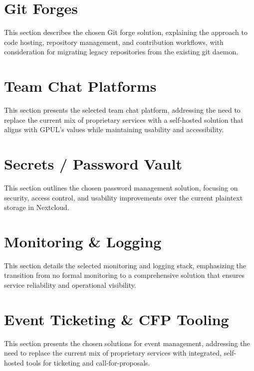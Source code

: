 \section{Git Forges}

This section describes the chosen Git forge solution, explaining the approach to code hosting, repository management, and contribution workflows, with consideration for migrating legacy repositories from the existing git daemon.

\section{Team Chat Platforms}

This section presents the selected team chat platform, addressing the need to replace the current mix of proprietary services with a self-hosted solution that aligns with GPUL's values while maintaining usability and accessibility.

\section{Secrets / Password Vault}

This section outlines the chosen password management solution, focusing on security, access control, and usability improvements over the current plaintext storage in Nextcloud.

\section{Monitoring \& Logging}

This section details the selected monitoring and logging stack, emphasizing the transition from no formal monitoring to a comprehensive solution that ensures service reliability and operational visibility.

\section{Event Ticketing \& CFP Tooling}

This section presents the chosen solutions for event management, addressing the need to replace the current mix of proprietary services with integrated, self-hosted tools for ticketing and call-for-proposals.

